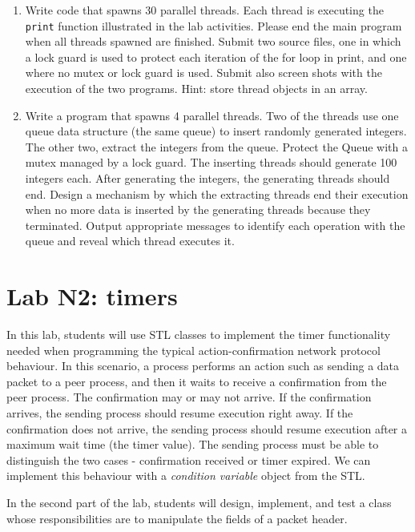 \documentclass[12pt]{book}
\begin{document}
  \begin{enumerate}[label=\arabic*.]
  \item Write code that spawns 30 parallel threads. Each thread is executing the \verb$print$ function illustrated in the lab activities. Please end the main program when all threads spawned are finished. Submit two source files, one in which a lock guard is used to protect each iteration of the for loop in print, and one where no mutex or lock guard is used. Submit also screen shots with the execution of the two programs. Hint: store thread objects in an array.


  \item Write a program that spawns 4 parallel threads. Two of the threads use one queue data structure (the same queue) to insert randomly generated integers. The other two, extract the integers from the queue. Protect the Queue with a mutex managed by a lock guard. The inserting threads should generate 100 integers each. After generating the integers, the generating threads should end. Design a mechanism by which the extracting threads end their execution when no more data is inserted by the generating threads because they terminated. Output appropriate messages to identify each operation with the queue and reveal which thread executes it. 
  \end{enumerate}


\chapter{Lab N2: timers}

In this lab, students will use STL classes to implement the timer functionality needed when programming the typical action-confirmation network protocol behaviour. In this scenario, a process performs an action such as sending a data packet to a peer process, and then it waits to receive a confirmation from the peer process. The confirmation may or may not arrive. If the confirmation arrives, the sending process should resume execution right away. If the confirmation does not arrive, the sending process should resume execution after a maximum wait time (the timer value). The sending process must be able to distinguish the two cases - confirmation received or timer expired. We can implement this behaviour with a \emph{condition variable} object from the STL.

In the second part of the lab, students will design, implement, and test a class whose responsibilities are to manipulate the fields of a packet header.
\end{document}
